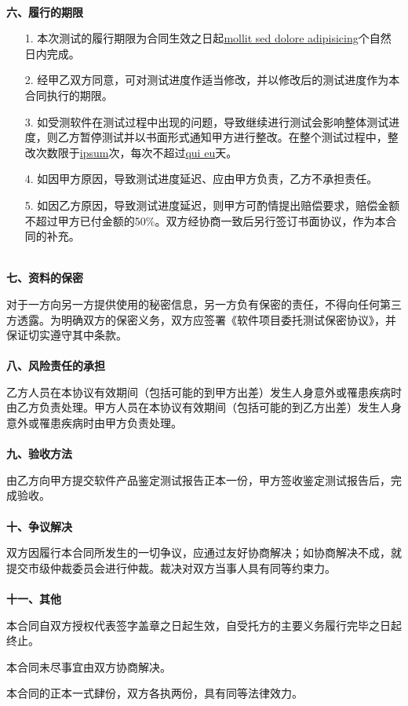 \documentclass[12pt]{article}%
\begin{document}
\\
\textbf{六、履行的期限}
\begin{itemize}
\item[1.] 本次测试的履行期限为合同生效之日起\uline{mollit sed dolore adipisicing}个自然日内完成。
\item[2.] 经甲乙双方同意，可对测试进度作适当修改，并以修改后的测试进度作为本合同执行的期限。
\item[3.] 如受测软件在测试过程中出现的问题，导致继续进行测试会影响整体测试进度，则乙方暂停测试并以书面形式通知甲方进行整改。在整个测试过程中，整改次数限于\uline{ipsum}次，每次不超过\uline{qui eu}天。
\item[4.] 如因甲方原因，导致测试进度延迟、应由甲方负责，乙方不承担责任。
\item[5.] 如因乙方原因，导致测试进度延迟，则甲方可酌情提出赔偿要求，赔偿金额不超过甲方已付金额的50\%。双方经协商一致后另行签订书面协议，作为本合同的补充。
\end{itemize}
~\\
\textbf{七、资料的保密}
\par
对于一方向另一方提供使用的秘密信息，另一方负有保密的责任，不得向任何第三方透露。为明确双方的保密义务，双方应签署《软件项目委托测试保密协议》，并保证切实遵守其中条款。\\
\\
\textbf{八、风险责任的承担}
\par
乙方人员在本协议有效期间（包括可能的到甲方出差）发生人身意外或罹患疾病时由乙方负责处理。甲方人员在本协议有效期间（包括可能的到乙方出差）发生人身意外或罹患疾病时由甲方负责处理。\\
\\
\textbf{九、验收方法}
\par
由乙方向甲方提交软件产品鉴定测试报告正本一份，甲方签收鉴定测试报告后，完成验收。\\
\\
\textbf{十、争议解决}
\par
双方因履行本合同所发生的一切争议，应通过友好协商解决；如协商解决不成，就提交市级仲裁委员会进行仲裁。裁决对双方当事人具有同等约束力。\\
\\
\textbf{十一、其他}
\par
本合同自双方授权代表签字盖章之日起生效，自受托方的主要义务履行完毕之日起终止。
\par
本合同未尽事宜由双方协商解决。
\par
本合同的正本一式肆份，双方各执两份，具有同等法律效力。
\end{document}

